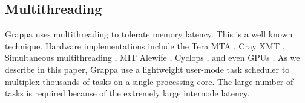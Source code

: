 \subsection{Multithreading}

Grappa uses multithreading to tolerate memory latency. This is a well known
technique. Hardware implementations include the Tera MTA \cite{Tera}, Cray XMT
\cite{XMT}, Simultaneous multithreading \cite{SMT}, MIT Alewife
\cite{Alewife}, Cyclops \cite{Cyclops}, and even GPUs \cite{fatahalian}. As we
describe in this paper, Grappa use a lightweight user-mode task scheduler to
multiplex thousands of tasks on a single processing core. The large number of
tasks is required because of the extremely large internode latency.
